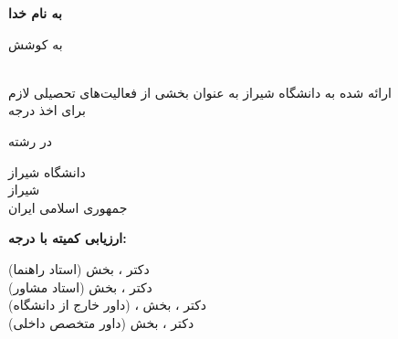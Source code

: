 \begin{center}
    \textbf{به نام خدا}

    \vspace{\baselineskip}
    \textbf{\persiantitle}

    \vspace{\baselineskip}
    به کوشش \\
    \textbf{\persianname}

    \vspace{\baselineskip}
    {\persiantype} \\
    ارائه شده به دانشگاه شیراز به عنوان بخشی از فعالیت‌های تحصیلی لازم \\ برای اخذ درجه {\persiandegree}

    \vspace{\baselineskip}
    در رشته \\
    {\persianfield}

    \vspace{\baselineskip}
    دانشگاه شیراز \\
    شیراز \\
    جمهوری اسلامی ایران
\end{center}

\noindent
\textbf{ارزیابی کمیته {\persiantype} با درجه: {\persiangrade}}

\noindent
دکتر {\persiansupervisor}، {\persiansupervisortitle} بخش {\persiansupervisordepartment} (استاد راهنما) \dotfill \\
دکتر {\persianadvisor}، {\persianadvisortitle} بخش {\persianadvisordepartment} (استاد مشاور) \dotfill \\
دکتر {\persianexternalreferee}، {\persianexternalrefereetitle} بخش {\persianexternalrefereedepartment}، {\persianexternalrefereeuniversity} (داور خارج از دانشگاه) \dotfill \\
دکتر {\persianreferee}، {\persianrefereetitle} بخش {\persianrefereedepartment} (داور متخصص داخلی) \dotfill

\vspace{\baselineskip}
\centerline{\persiandate}
